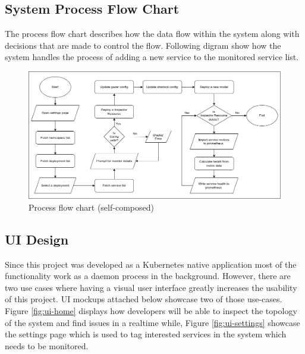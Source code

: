 \subsection{System Process Flow Chart}

The process flow chart describes how the data flow within the system along with decisions that are made to control the flow. Following digram show how the system handles the process of adding a new service to the monitored service list.

\begin{figure}[H]
    \includegraphics[width=16cm]{assets/system-design/process-flow-chart.png}
    \caption{Process flow chart (self-composed)}
\end{figure}

\subsection{UI Design}

Since this project was developed as a Kubernetes native application most of the functionality work as a daemon process in the background. However, there are two use cases where having a visual user interface greatly increases the usability of this project. UI mockups attached below showcase two of those use-cases. Figure \ref{fig:ui-home} displays how developers will be able to inspect the topology of the system and find issues in a realtime while, Figure \ref{fig:ui-settings} showcase the settings page which is used to tag interested services in the system which needs to be monitored.

